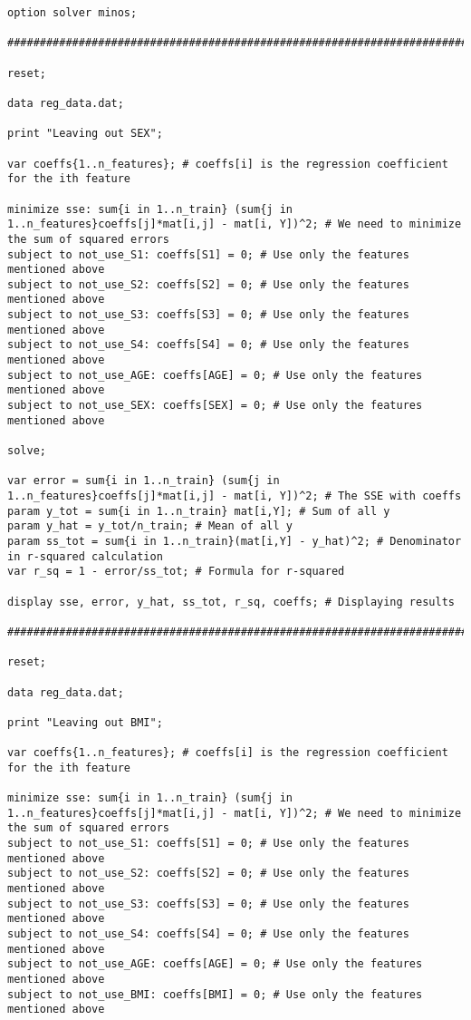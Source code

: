 \documentclass[15pt,a4paper,openright]{article}
\begin{document}
\begin{lstlisting}[language=AMPL, caption=1b Code]
option solver minos;

#########################################################################

reset;

data reg_data.dat;

print "Leaving out SEX";

var coeffs{1..n_features}; # coeffs[i] is the regression coefficient for the ith feature

minimize sse: sum{i in 1..n_train} (sum{j in 1..n_features}coeffs[j]*mat[i,j] - mat[i, Y])^2; # We need to minimize the sum of squared errors
subject to not_use_S1: coeffs[S1] = 0; # Use only the features mentioned above
subject to not_use_S2: coeffs[S2] = 0; # Use only the features mentioned above
subject to not_use_S3: coeffs[S3] = 0; # Use only the features mentioned above
subject to not_use_S4: coeffs[S4] = 0; # Use only the features mentioned above
subject to not_use_AGE: coeffs[AGE] = 0; # Use only the features mentioned above
subject to not_use_SEX: coeffs[SEX] = 0; # Use only the features mentioned above

solve;

var error = sum{i in 1..n_train} (sum{j in 1..n_features}coeffs[j]*mat[i,j] - mat[i, Y])^2; # The SSE with coeffs
param y_tot = sum{i in 1..n_train} mat[i,Y]; # Sum of all y
param y_hat = y_tot/n_train; # Mean of all y
param ss_tot = sum{i in 1..n_train}(mat[i,Y] - y_hat)^2; # Denominator in r-squared calculation
var r_sq = 1 - error/ss_tot; # Formula for r-squared

display sse, error, y_hat, ss_tot, r_sq, coeffs; # Displaying results

#########################################################################

reset;

data reg_data.dat;

print "Leaving out BMI";

var coeffs{1..n_features}; # coeffs[i] is the regression coefficient for the ith feature

minimize sse: sum{i in 1..n_train} (sum{j in 1..n_features}coeffs[j]*mat[i,j] - mat[i, Y])^2; # We need to minimize the sum of squared errors
subject to not_use_S1: coeffs[S1] = 0; # Use only the features mentioned above
subject to not_use_S2: coeffs[S2] = 0; # Use only the features mentioned above
subject to not_use_S3: coeffs[S3] = 0; # Use only the features mentioned above
subject to not_use_S4: coeffs[S4] = 0; # Use only the features mentioned above
subject to not_use_AGE: coeffs[AGE] = 0; # Use only the features mentioned above
subject to not_use_BMI: coeffs[BMI] = 0; # Use only the features mentioned above


\end{lstlisting}
\end{document}
